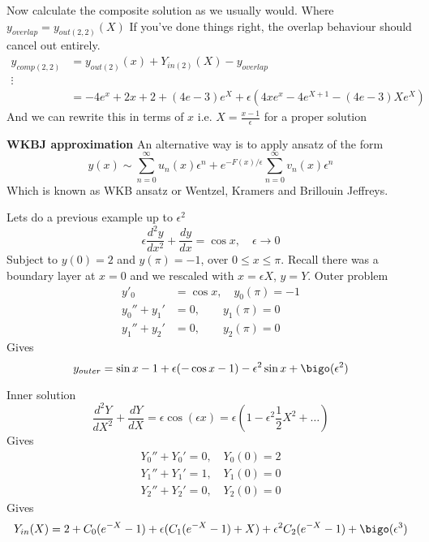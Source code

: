 \documentclass{X:/Documents/Coding/Latex/myassignment}
\begin{document}
Now calculate the composite solution as we usually would. Where $y_{overlap} = y_{out(2,2)}(X)$
If you've done things right, the overlap behaviour should cancel out entirely.
\begin{align*}
    y_{comp(2,2)} &= y_{out(2)}(x) + Y_{in(2)}(X) - y_{overlap}\\
    \vdots&\\
    &= -4e^x + 2x + 2 + (4e-3)e^X + \epsilon\left(4xe^x - 4e^{X+1} - (4e-3) Xe^X\right)
\end{align*}
And we can rewrite this in terms of $x$ i.e. $X = \frac{x-1}{\epsilon}$ for a proper solution


\textbf{WKBJ approximation}
An alternative way is to apply ansatz of the form
\[y(x) \sim \sum_{n=0}^\infty u_n(x) \epsilon^n + e^{-F(x)/\epsilon} \sum_{n=0}^\infty v_n(x) \epsilon^n\]
Which is known as WKB ansatz or Wentzel, Kramers and Brillouin Jeffreys. 




Lets do a previous example up to $\epsilon^2$
\[\epsilon \frac{d^2y}{dx^2} + \frac{dy}{dx} = \cos x,\quad \epsilon\to 0\]
Subject to $y(0) = 2$ and $y(\pi) = -1$, over $0\leq x \leq \pi$. Recall there was a boundary layer at $x=0$ and we rescaled with $x=\epsilon X$, $y=Y$.
Outer problem
\begin{align*}
    y'_0 &= \cos x,\quad  y_0(\pi) = -1\\
    y_0'' + y_1' &= 0 ,\qquad  y_1(\pi) = 0\\
    y_1'' + y_2' &= 0,\qquad y_2(\pi) =0
\end{align*}
Gives
\[y_{outer} = \sin x -1 + \epsilon(-\cos x - 1) - \epsilon^2 \sin x + \bigo(\epsilon^2)\]



Inner solution  
\[\frac{d^2Y}{dX^2} + \frac{dY}{dX} = \epsilon \cos(\epsilon x) = \epsilon\left(1 - \epsilon^2 \frac12 X^2 + \hdots\right)\]
Gives
\begin{align*}
    Y_0'' + Y_0' = 0,\quad Y_0(0)=2\\
    Y_1'' + Y_1' =1,\quad Y_1(0)=0\\
    Y_2'' + Y_2' = 0,\quad Y_2(0)=0
\end{align*}
Gives
\[Y_{in}(X) = 2 + C_0 (e^{-X} - 1) + \epsilon (C_1 (e^{-X} -1) + X) + \epsilon^2 C_2(e^{-X} -1) + \bigo(\epsilon^3)\]
\end{document}
